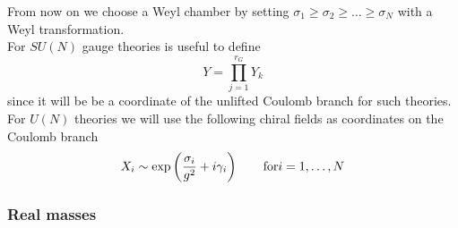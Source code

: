 From now on we choose a Weyl chamber by setting $\sigma_1 \geq \sigma_2 \geq \dots \geq \sigma_N$ with a Weyl transformation.\\
For $SU(N)$ gauge theories is useful to define
\begin{equation}
 Y = \prod_{j=1}^{r_G} Y_k
 \label{eqn:definition_of_Y_sun}
\end{equation}
since it will be be a coordinate of the unlifted Coulomb branch for such theories.\\
For $U(N)$ theories we will use the following chiral fields as coordinates on the Coulomb branch 
\begin{equation}
X_i  \sim \exp \left( \frac{\sigma_i}{g^2} + i \gamma_i \right) \qquad \hbox{for} i = 1, \dots , N
\label{eqn:defined_un_cb_coordinates}
\end{equation}














\subsubsection{Real masses}

